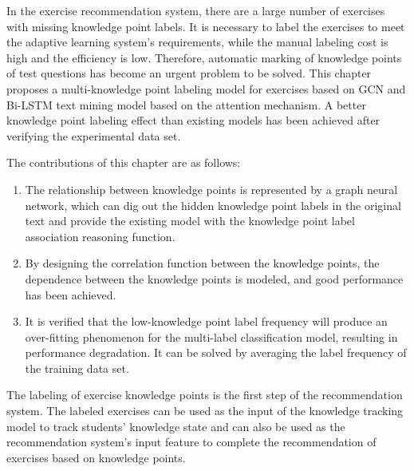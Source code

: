 
In the exercise recommendation system, there are a large number of exercises with missing knowledge point labels. It is necessary to label the exercises to meet the adaptive learning system's requirements, while the manual labeling cost is high and the efficiency is low. Therefore, automatic marking of knowledge points of test questions has become an urgent problem to be solved. This chapter proposes a multi-knowledge point labeling model for exercises based on GCN and Bi-LSTM text mining model based on the attention mechanism. A better knowledge point labeling effect than existing models has been achieved after verifying the experimental data set.

The contributions of this chapter are as follows:
\begin{enumerate}
    \item The relationship between knowledge points is represented by a graph neural network, which can dig out the hidden knowledge point labels in the original text and provide the existing model with the knowledge point label association reasoning function.
    \item By designing the correlation function between the knowledge points, the dependence between the knowledge points is modeled, and good performance has been achieved.
    \item It is verified that the low-knowledge point label frequency will produce an over-fitting phenomenon for the multi-label classification model, resulting in performance degradation. It can be solved by averaging the label frequency of the training data set.
\end{enumerate}

The labeling of exercise knowledge points is the first step of the recommendation system. The labeled exercises can be used as the input of the knowledge tracking model to track students' knowledge state and can also be used as the recommendation system's input feature to complete the recommendation of exercises based on knowledge points.

